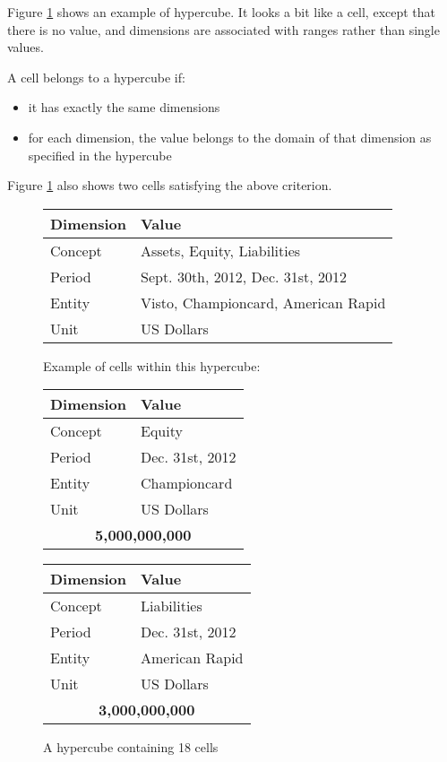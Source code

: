 \documentclass{vldb}
\begin{document}
Figure \ref{fig-hypercube} shows an example of hypercube. It looks a bit like a cell, except that there is no value, and dimensions are associated with ranges rather than single values.

A cell belongs to a hypercube if:

\begin{itemize}
\item it has exactly the same dimensions
\item for each dimension, the value belongs to the domain of that dimension as specified in the hypercube
\end{itemize}

Figure \ref{fig-hypercube} also shows two cells satisfying the above criterion.

\begin{figure}
\caption{A hypercube containing 18 cells}
\label{fig-hypercube}
\begin{tabular}{|l|l|}
\hline
Dimension & Value \\
\hline
Concept & Assets, Equity, Liabilities \\
Period & Sept. 30th, 2012, Dec. 31st, 2012 \\
Entity & Visto, Championcard, American Rapid \\
Unit & US Dollars \\
\hline
\end{tabular}

Example of cells within this hypercube:

\begin{tabular}{|l|l|}
\hline
Dimension & Value \\
\hline
Concept & Equity \\
Period & Dec. 31st, 2012 \\
Entity & Championcard \\
Unit & US Dollars \\
\hline
\multicolumn{2}{|c|}{\textbf{5,000,000,000}} \\
\hline
\end{tabular}
\begin{tabular}{|l|l|}
\hline
Dimension & Value \\
\hline
Concept & Liabilities \\
Period & Dec. 31st, 2012 \\
Entity & American Rapid \\
Unit & US Dollars \\
\hline
\multicolumn{2}{|c|}{\textbf{3,000,000,000}} \\
\hline
\end{tabular}
\end{figure}
\end{document}
